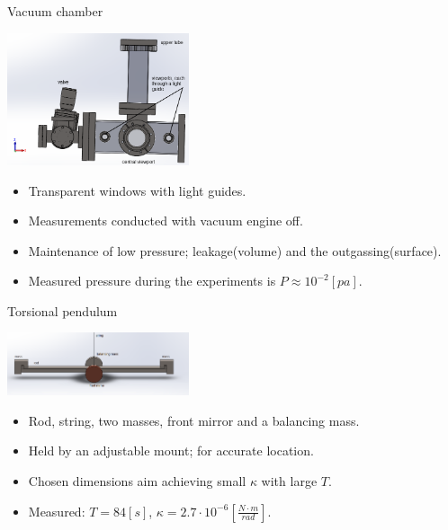 \documentclass{beamer}
\begin{document}
\begin{frame}{Vacuum chamber}
	\begin{center}		
		\includegraphics[width=0.4\textwidth,keepaspectratio]{chamber_front_names.PNG}
	\end{center}
	\begin{itemize}

		\item Transparent windows with light guides.
		\pause
		\item Measurements conducted with vacuum engine off.
		\item Maintenance of low pressure; leakage(volume) and the outgassing(surface).
		\item Measured pressure during the experiments is $P \approx  10^{-2} [pa]$.
		
	\end{itemize}
	
\end{frame}


\begin{frame}{Torsional pendulum}
	\begin{center}		
		\includegraphics[width=0.4\textwidth,keepaspectratio]{pendulum_front_names.png}
	\end{center}
	\begin{itemize}

		\item Rod, string, two masses, front mirror and a balancing mass.
		\pause
		\item Held by an adjustable mount; for accurate location. 
		\item Chosen dimensions aim achieving small $\kappa$ with large $T$.
		\item Measured: $T = 84[s]$, $\kappa = 2.7\cdot10^{-6}[\frac{N\cdot m}{rad}]$.
	\end{itemize}
	
\end{frame}
\end{document}
